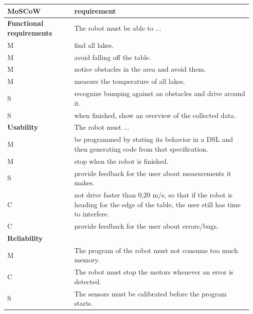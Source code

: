 \documentclass[11pt,a4paper]{article}
\begin{document}
\begin{tabular}{|p{5cm}|p{10cm}|} 
\hline
MoSCoW & requirement\\
\hline
\hline
  \textbf{Functional requirements} & The robot must be able to ...\\
\hline
M & find all lakes.\\
M & avoid falling off the table.\\
M & notice obstacles in the area and avoid them.\\
M & measure the temperature of all lakes.\\
S & recognize bumping against an obstacles and drive around it.\\
S & when finished, show an overview of the collected data.\\
\hline

  \textbf{Usability} & The robot must ...\\
\hline
M & be programmed by stating its behavior in a DSL and then generating code from that specification.\\
M & stop when the robot is finished.\\
S & provide feedback for the user about measurements it makes.\\
C & not drive faster than 0,20 m/s, so that if the robot is heading for the edge of the table, the user still has time to interfere.\\
C & provide feedback for the user about errors/bugs.\\
\hline

  \textbf{Reliability}& \\
\hline
M & The program of the robot must not consume too much memory.\\
C & The robot must stop the motors whenever an error is detected.\\
S & The sensors must be calibrated before the program starts.\\
\hline


\end{tabular}
\end{document}
